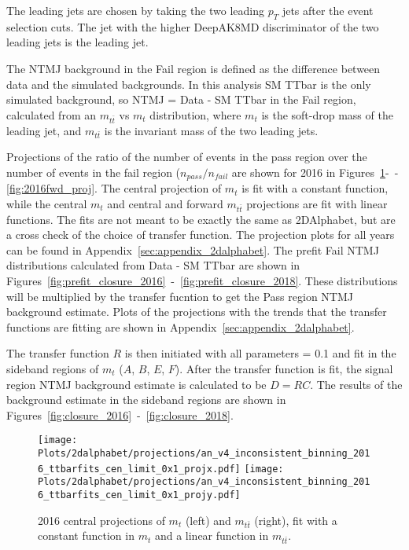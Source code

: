 The leading jets are chosen by taking the two leading $p_T$ jets after the event selection cuts. The jet with the higher DeepAK8MD discriminator of the two leading jets is the leading jet.

The NTMJ background in the Fail region is defined as the difference between data and the simulated backgrounds. In this analysis SM TTbar is the only simulated background, so NTMJ = Data - SM TTbar in the Fail region, calculated from an $m_{t \bar{t}}$ vs $m_t$ distribution, where $m_t$ is the soft-drop mass of the leading jet, and $m_{t \bar{t}}$ is the invariant mass of the two leading jets. 


Projections of the ratio of the number of events in the pass region over the number of events in the fail region ($n_{pass}/n_{fail}$ are shown for 2016 in Figures~\ref{fig:2016cen_proj}-~-\ref{fig:2016fwd_proj}. The central projection of $m_t$ is fit with a constant function, while the central $m_t$ and central and forward $m_{t\bar{t}}$ projections are fit with linear functions. The fits are not meant to be exactly the same as 2DAlphabet, but are a cross check of the choice of transfer function. The projection plots for all years can be found in Appendix~\ref{sec:appendix_2dalphabet}. The prefit Fail NTMJ distributions calculated from Data - SM TTbar are shown in Figures~\ref{fig:prefit_closure_2016}~-~\ref{fig:prefit_closure_2018}. These distributions will be multiplied by the transfer fucntion to get the Pass region NTMJ background estimate. Plots of the projections with the trends that the transfer functions are fitting are shown in Appendix~\ref{sec:appendix_2dalphabet}.


The transfer function $R$ is then initiated with all parameters = 0.1 and fit in the sideband regions of $m_t$ ($A$, $B$, $E$, $F$). After the transfer function is fit, the signal region NTMJ background estimate is calculated to be $D = R C$. The results of the background estimate in the sideband regions are shown in Figures~\ref{fig:closure_2016}~-~\ref{fig:closure_2018}.


\begin{figure}[htp]
	\begin{center}
		
		\texttt{[image: Plots/2dalphabet/projections/an\_v4\_inconsistent\_binning\_2016\_ttbarfits\_cen\_limit\_0x1\_projx.pdf]}
		\texttt{[image: Plots/2dalphabet/projections/an\_v4\_inconsistent\_binning\_2016\_ttbarfits\_cen\_limit\_0x1\_projy.pdf]}
		\caption{2016 central projections of $m_t$ (left) and $m_{t\bar{t}}$ (right), fit with a constant function in $m_t$ and a linear function in $m_{t\bar{t}}$.}
		\label{fig:2016cen_proj}
	\end{center}
\end{figure}



